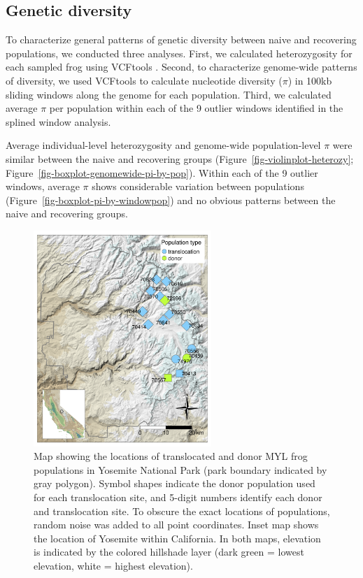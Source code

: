 \documentclass[9pt,twoside,lineno]{pnas-new-SI}
\begin{document}
\hypertarget{genetic-diversity}{%
\subsection{Genetic diversity}\label{genetic-diversity}}

To characterize general patterns of genetic diversity between naive and
recovering populations, we conducted three analyses. First, we
calculated heterozygosity for each sampled frog using VCFtools
\citep{danecek2011}. Second, to characterize genome-wide patterns of
diversity, we used VCFtools to calculate nucleotide diversity (\(\pi\))
in 100kb sliding windows along the genome for each population. Third, we
calculated average \(\pi\) per population within each of the 9 outlier
windows identified in the splined window analysis.

Average individual-level heterozygosity and genome-wide population-level
\(\pi\) were similar between the naive and recovering groups
(Figure~\ref{fig-violinplot-heterozy};
Figure~\ref{fig-boxplot-genomewide-pi-by-pop}). Within each of the 9
outlier windows, average \(\pi\) shows considerable variation between
populations (Figure~\ref{fig-boxplot-pi-by-windowpop}) and no obvious
patterns between the naive and recovering groups.

\newpage

\newpage

\begin{figure}

{\centering \includegraphics[width=0.60\textwidth]{figures/map_translocation_points.png}

}

\caption{\label{fig-yosemap}Map showing the locations of translocated
and donor MYL frog populations in Yosemite National Park (park boundary
indicated by gray polygon). Symbol shapes indicate the donor population
used for each translocation site, and 5-digit numbers identify each
donor and translocation site. To obscure the exact locations of
populations, random noise was added to all point coordinates. Inset map
shows the location of Yosemite within California. In both maps,
elevation is indicated by the colored hillshade layer (dark green =
lowest elevation, white = highest elevation).}

\end{figure}\clearpage
\end{document}
